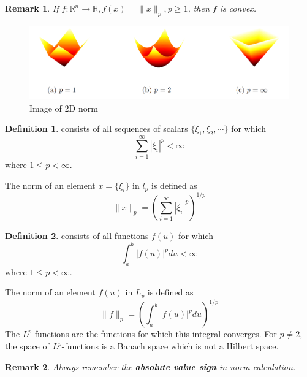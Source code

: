 \documentclass[a4paper]{article}
\theoremstyle{definition}
\newtheorem{definition}{Definition}
\theoremstyle{plain}
\newtheorem{remark}{Remark}
\begin{document}
\begin{remark}
If $f:\mathbb{R}^n\rightarrow\mathbb{R}, f(x)=\|x\|_p, p\ge1$, then $f$ is convex.
\end{remark}

\begin{figure}[H]\label{convex}
\centering
\includegraphics[scale=0.25]{figure/convex.png}
\caption{Image of 2D norm}
\end{figure}

\begin{definition}
 consists of all sequences of scalars $\{\xi_1,\xi_2,\cdots\}$ for which
\begin{equation*}
    \sum^\infty_{i=1}|\xi_i|^p<\infty
\end{equation*}
where $1\le p<\infty$.
\end{definition}
The norm of an element $x=\{\xi_i\}$ in $l_p$ is defined as 
\begin{equation*}
    \|x\|_p=\left(\sum^\infty_{i=1}|\xi_i|^p\right)^{1/p}
\end{equation*}

\begin{definition}
 consists of all functions $f(u)$ for which
\begin{equation*}
    \int^b_a|f(u)|^pdu<\infty
\end{equation*}
where $1\le p<\infty$.
\end{definition}
The norm of an element $f(u)$ in $L_p$ is defined as 
\begin{equation*}
    \|f\|_p=\left(\int^b_a|f(u)|^pdu\right)^{1/p}
\end{equation*}
The $L^p$-functions are the functions for which this integral converges. For $p\not=2$, the space of $L^p$-functions is a Banach space which is not a Hilbert space.
\begin{remark}
Always remember the \textbf{absolute value sign} in norm calculation.
\end{remark}
\end{document}
